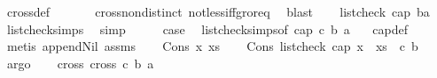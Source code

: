 \begin{isabellebody}
\ cross{}{\isacharunderscore}{\kern0pt}def\ \isanewline
\ \ \ \ \isamarkupfalse%
\ cross{}{\isacharunderscore}{\kern0pt}non{}{\isacharunderscore}{\kern0pt}distinct\ not{\isacharunderscore}{\kern0pt}less{\isacharunderscore}{\kern0pt}iff{\isacharunderscore}{\kern0pt}gr{\isacharunderscore}{\kern0pt}or{\isacharunderscore}{\kern0pt}eq\ \isamarkupfalse%
\ blast\isanewline
\ \ \isamarkupfalse%
\ {\isachardoublequoteopen}list{\isacharunderscore}{\kern0pt}check\ cap{}\ {\isacharbrackleft}{\kern0pt}b{\isacharcomma}{\kern0pt}a{\isacharbrackright}{\kern0pt}{\isachardoublequoteclose}\ \isamarkupfalse%
\ list{\isacharunderscore}{\kern0pt}check{\isachardot}{\kern0pt}simps{\isacharparenleft}{\kern0pt}{}{\isacharparenright}{\kern0pt}\ \isamarkupfalse%
\ simp\isanewline
\ \ \isamarkupfalse%
\ \isamarkupfalse%
\ {\isacharquery}{\kern0pt}case\ \isamarkupfalse%
\ list{\isacharunderscore}{\kern0pt}check{\isachardot}{\kern0pt}simps{\isacharparenleft}{\kern0pt}{}{\isacharparenright}{\kern0pt}{\isacharbrackleft}{\kern0pt}of\ {\isachardoublequoteopen}cap{}{\isachardoublequoteclose}\ c\ b\ a\ {\isachardoublequoteopen}{\isacharbrackleft}{\kern0pt}{\isacharbrackright}{\kern0pt}{\isachardoublequoteclose}{\isacharbrackright}{\kern0pt}\ \isamarkupfalse%
\ cap{}{\isacharunderscore}{\kern0pt}def\isanewline
\ \ \ \ \isamarkupfalse%
\ {\isacharparenleft}{\kern0pt}metis\ append{\isacharunderscore}{\kern0pt}Nil\ assms{\isacharparenleft}{\kern0pt}{}{\isacharparenright}{\kern0pt}{\isacharparenright}{\kern0pt}\isanewline
{}\isamarkupfalse%
\isanewline
\ \ \isamarkupfalse%
\ {\isacharparenleft}{\kern0pt}Cons\ x\ xs{\isacharparenright}{\kern0pt}\isanewline
\ \ \isamarkupfalse%
\ Cons{}{\isacharcolon}{\kern0pt}{\isachardoublequoteopen}\ list{\isacharunderscore}{\kern0pt}check\ cap{}\ {\isacharparenleft}{\kern0pt}{\isacharparenleft}{\kern0pt}x\ {\isacharhash}{\kern0pt}\ xs{\isacharparenright}{\kern0pt}\ {\isacharat}{\kern0pt}\ {\isacharbrackleft}{\kern0pt}c{\isacharcomma}{\kern0pt}\ b{\isacharbrackright}{\kern0pt}{\isacharparenright}{\kern0pt}{\isachardoublequoteclose}\ \isamarkupfalse%
\ argo\isanewline
\ \ \isamarkupfalse%
\ cross{}{\isacharcolon}{\kern0pt}\ {\isachardoublequoteopen}cross{}\ c\ b\ a\ {\isacharless}{\kern0pt}\ {}{\isachardoublequoteclose}\ \isamarkupfalse%

\end{isabellebody}
